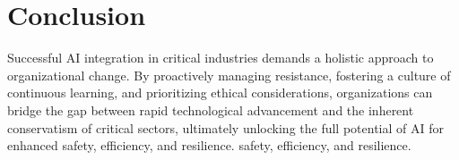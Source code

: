 \section{Conclusion}
Successful AI integration in critical industries demands a holistic approach to organizational change. By proactively managing resistance, fostering a culture of continuous learning, and prioritizing ethical considerations, organizations can bridge the gap between rapid technological advancement and the inherent conservatism of critical sectors, ultimately unlocking the full potential of AI for enhanced safety, efficiency, and resilience.
 safety, efficiency, and resilience.
